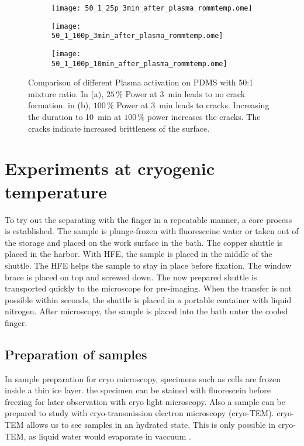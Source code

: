 \begin{figure}[hbt!]
	\centering
	\begin{subfigure}[]{0.45\textwidth}
		\centering
		\texttt{[image: 50\_1\_25p\_3min\_after\_plasma\_rommtemp.ome]}
		\caption{}
	\end{subfigure}
	\begin{subfigure}[]{0.45\textwidth}
		\centering
		\texttt{[image: 50\_1\_100p\_3min\_after\_plasma\_rommtemp.ome]}
		\caption{}
	\end{subfigure}
	\begin{subfigure}[]{0.45\textwidth}
		\centering
		\texttt{[image: 50\_1\_100p\_10min\_after\_plasma\_rommtemp.ome]}
		\caption{}
	\end{subfigure}
	\caption{Comparison of different Plasma activation on PDMS with 50:1 mixture ratio. In (a), $25\,\%$ Power at \SI{3}{\minute} leads to no crack formation. in (b), $100\,\%$ Power at \SI{3}{\minute} leads to cracks. Increasing the duration to \SI{10}{\minute} at $100\,\%$ power increases the cracks. The cracks indicate increased brittleness of the surface.}
	\label{fig:Vgl50:1Plasma}
\end{figure}

\FloatBarrier

\section{Experiments at cryogenic temperature}

To try out the separating with the finger in a repeatable manner, a core process is established. The sample is plunge-frozen with fluoresceine water or taken out of the storage and placed on the work surface in the bath. The copper shuttle is placed in the harbor. With HFE, the sample is placed in the middle of the shuttle. The HFE helps the sample to stay in place before fixation. The window brace is placed on top and screwed down. The now prepared shuttle is transported quickly to the microscope for pre-imaging. When the transfer is not possible within seconds, the shuttle is placed in a portable container with liquid nitrogen. After microscopy, the sample is placed into the bath unter the cooled finger. 

\subsection{Preparation of samples}

In sample preparation for cryo microscopy, specimens such as cells are frozen inside a thin ice layer. the specimen can be stained with fluorescein before freezing for later observation with cryo light microscopy. Also a sample can be prepared to study with cryo-transmission electron microscopy (cryo-TEM). cryo-TEM allows us to see samples in an hydrated state. This is only possible in cryo-TEM, as liquid water would evaporate in vaccuum \cite{Danino.2012}.

